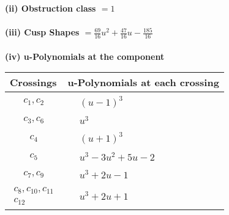 \documentclass[1p]{elsarticle_modified}
\theoremstyle{definition}
\begin{document}
\flushleft \textbf{(ii) Obstruction class $= 1$}\\~\\
\flushleft \textbf{(iii) Cusp Shapes $= \frac{69}{16} u^2+\frac{47}{16} u-\frac{185}{16}$}\\~\\
\newpage\renewcommand{\arraystretch}{1}
\flushleft \textbf{(iv) u-Polynomials at the component}\newline \\
\begin{tabular}{m{50pt}|m{274pt}}
Crossings & \hspace{64pt}u-Polynomials at each crossing \\
\hline $$\begin{aligned}c_{1},c_{2}\end{aligned}$$&$\begin{aligned}
&(u-1)^3
\end{aligned}$\\
\hline $$\begin{aligned}c_{3},c_{6}\end{aligned}$$&$\begin{aligned}
&u^3
\end{aligned}$\\
\hline $$\begin{aligned}c_{4}\end{aligned}$$&$\begin{aligned}
&(u+1)^3
\end{aligned}$\\
\hline $$\begin{aligned}c_{5}\end{aligned}$$&$\begin{aligned}
&u^3-3 u^2+5 u-2
\end{aligned}$\\
\hline $$\begin{aligned}c_{7},c_{9}\end{aligned}$$&$\begin{aligned}
&u^3+2 u-1
\end{aligned}$\\
\hline $$\begin{aligned}c_{8},c_{10},c_{11}\\c_{12}\end{aligned}$$&$\begin{aligned}
&u^3+2 u+1
\end{aligned}$\\
\hline
\end{tabular}\\~\\
\end{document}
